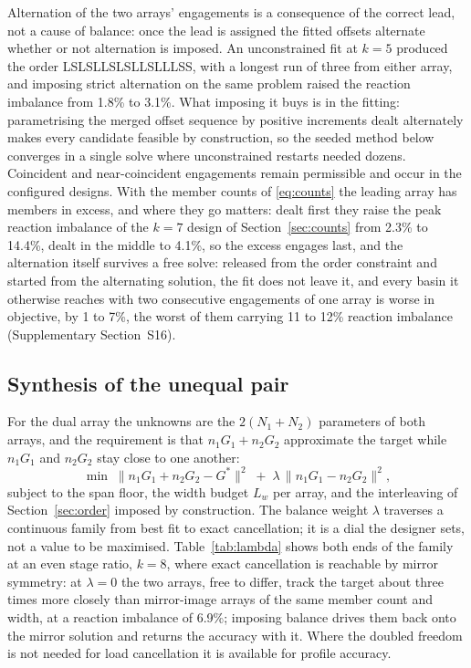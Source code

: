 \documentclass[preprint,12pt,number]{elsarticle}
\newcommand{\Gstar}{G^{*}}
\newcommand{\Lw}{L_{w}}
\begin{document}
Alternation of the two arrays' engagements is a consequence of the correct lead, not a cause of balance: once the lead is assigned the fitted offsets alternate whether or not alternation is imposed. An unconstrained fit at $k=5$ produced the order LSLSLLSLSLLSLLLSS, with a longest run of three from either array, and imposing strict alternation on the same problem raised the reaction imbalance from 1.8\% to 3.1\%. What imposing it buys is in the fitting: parametrising the merged offset sequence by positive increments dealt alternately makes every candidate feasible by construction, so the seeded method below converges in a single solve where unconstrained restarts needed dozens. Coincident and near-coincident engagements remain permissible and occur in the configured designs. With the member counts of \eqref{eq:counts} the leading array has members in excess, and where they go matters: dealt first they raise the peak reaction imbalance of the $k=7$ design of Section~\ref{sec:counts} from 2.3\% to 14.4\%, dealt in the middle to 4.1\%, so the excess engages last, and the alternation itself survives a free solve: released from the order constraint and started from the alternating solution, the fit does not leave it, and every basin it otherwise reaches with two consecutive engagements of one array is worse in objective, by 1 to 7\%, the worst of them carrying 11 to 12\% reaction imbalance (Supplementary Section~S16).

\subsection{Synthesis of the unequal pair}
\label{sec:dualsynth}

For the dual array the unknowns are the $2(N_1 + N_2)$ parameters of both arrays, and the requirement is that $n_1 G_1 + n_2 G_2$ approximate the target while $n_1 G_1$ and $n_2 G_2$ stay close to one another:
\begin{equation}
\min\; \bigl\| n_1 G_1 + n_2 G_2 - \Gstar \bigr\|^2 \;+\; \lambda\, \bigl\| n_1 G_1 - n_2 G_2 \bigr\|^2,
\label{eq:dual-obj}
\end{equation}
subject to the span floor, the width budget $\Lw$ per array, and the interleaving of Section~\ref{sec:order} imposed by construction. The balance weight $\lambda$ traverses a continuous family from best fit to exact cancellation; it is a dial the designer sets, not a value to be maximised. Table~\ref{tab:lambda} shows both ends of the family at an even stage ratio, $k=8$, where exact cancellation is reachable by mirror symmetry: at $\lambda = 0$ the two arrays, free to differ, track the target about three times more closely than mirror-image arrays of the same member count and width, at a reaction imbalance of 6.9\%; imposing balance drives them back onto the mirror solution and returns the accuracy with it. Where the doubled freedom is not needed for load cancellation it is available for profile accuracy.
\end{document}
